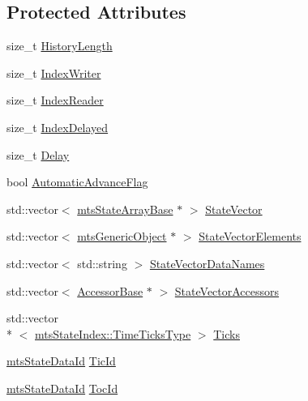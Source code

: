 \subsection*{Protected Attributes}
\begin{DoxyCompactItemize}
\item 
size\-\_\-t \hyperlink{classmts_state_table_a922d394133217df6961407a890d21913}{History\-Length}
\item 
size\-\_\-t \hyperlink{classmts_state_table_aec4f467171255f1898ec74f78f90a901}{Index\-Writer}
\item 
size\-\_\-t \hyperlink{classmts_state_table_a3735ec3378d9461a2a57028ec0e8aa70}{Index\-Reader}
\item 
size\-\_\-t \hyperlink{classmts_state_table_a21a94033326261d2aa69dec1e7000aea}{Index\-Delayed}
\item 
size\-\_\-t \hyperlink{classmts_state_table_af676579bdc8d7e1a8616708a612dbed1}{Delay}
\item 
bool \hyperlink{classmts_state_table_acbe22d62ae7c8190c92059bc50da941d}{Automatic\-Advance\-Flag}
\item 
std\-::vector$<$ \hyperlink{classmts_state_array_base}{mts\-State\-Array\-Base} $\ast$ $>$ \hyperlink{classmts_state_table_a744da952e79c0336d4208a841ae35aae}{State\-Vector}
\item 
std\-::vector$<$ \hyperlink{classmts_generic_object}{mts\-Generic\-Object} $\ast$ $>$ \hyperlink{classmts_state_table_a9752b943b66ae808210cff3fde497be3}{State\-Vector\-Elements}
\item 
std\-::vector$<$ std\-::string $>$ \hyperlink{classmts_state_table_ad7b3a968771bc125b3865a4547ec92fe}{State\-Vector\-Data\-Names}
\item 
std\-::vector$<$ \hyperlink{classmts_state_table_1_1_accessor_base}{Accessor\-Base} $\ast$ $>$ \hyperlink{classmts_state_table_a5eb62dbdd241d316b7a18ef22f68ae91}{State\-Vector\-Accessors}
\item 
std\-::vector\\*
$<$ \hyperlink{classmts_state_index_a80d0a5acdec3b616347ddea2912b6294}{mts\-State\-Index\-::\-Time\-Ticks\-Type} $>$ \hyperlink{classmts_state_table_a387cab6dc638d33ded48538d13274068}{Ticks}
\item 
\hyperlink{mts_state_table_8h_ac3a0e34e8991d51790b043fa01857a35}{mts\-State\-Data\-Id} \hyperlink{classmts_state_table_abf08ee55060e6fcc154161cec9a18fc1}{Tic\-Id}
\item 
\hyperlink{mts_state_table_8h_ac3a0e34e8991d51790b043fa01857a35}{mts\-State\-Data\-Id} \hyperlink{classmts_state_table_aa2e6cbe1e5ae5a1a58ebe3fcff10db35}{Toc\-Id}

\end{DoxyCompactItemize}
